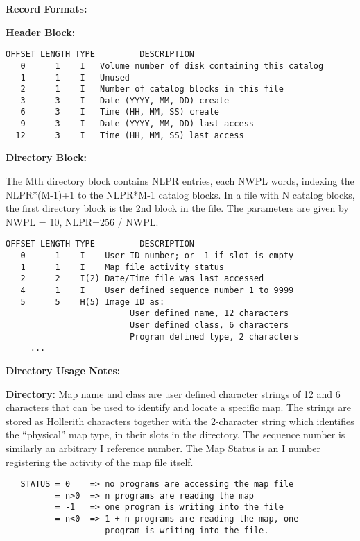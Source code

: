 {\bf Record Formats:}

{\bf Header Block:}


\begin{verbatim}
OFFSET LENGTH TYPE         DESCRIPTION
   0      1    I   Volume number of disk containing this catalog
   1      1    I   Unused
   2      1    I   Number of catalog blocks in this file
   3      3    I   Date (YYYY, MM, DD) create
   6      3    I   Time (HH, MM, SS) create
   9      3    I   Date (YYYY, MM, DD) last access
  12      3    I   Time (HH, MM, SS) last access
\end{verbatim}

{\bf Directory Block:}


     The Mth directory block contains NLPR entries, each NWPL words,
indexing the NLPR*(M-1)+1 to the NLPR*M-1 catalog blocks.  In a file
with N catalog blocks, the first directory block is the 2nd block in
the file.  The parameters are given by NWPL = 10, NLPR=256 / NWPL.

\begin{verbatim}
OFFSET LENGTH TYPE         DESCRIPTION
   0      1    I    User ID number; or -1 if slot is empty
   1      1    I    Map file activity status
   2      2    I(2) Date/Time file was last accessed
   4      1    I    User defined sequence number 1 to 9999
   5      5    H(5) Image ID as:
                         User defined name, 12 characters
                         User defined class, 6 characters
                         Program defined type, 2 characters
     ...

\end{verbatim}

{\bf Directory Usage Notes:}


   {\bf Directory:} Map name and class are user defined character
strings of 12 and 6 characters that can be used to identify and locate
a specific map.  The strings are stored as Hollerith characters
together with the 2-character string which identifies the ``physical''
map type, in their slots in the directory.  The sequence number is
similarly an arbitrary I reference number.  The Map Status is an I
number registering the activity of the map file itself.
\begin{verbatim}
   STATUS = 0    => no programs are accessing the map file
          = n>0  => n programs are reading the map
          = -1   => one program is writing into the file
          = n<0  => 1 + n programs are reading the map, one
                    program is writing into the file.
\end{verbatim}

